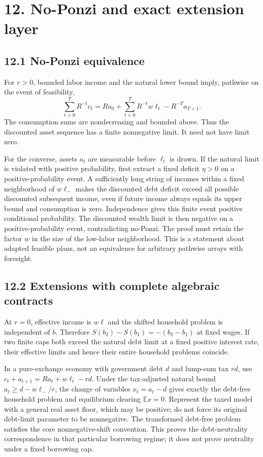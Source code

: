 \documentclass[
  11pt,
]{article}
\begin{document}
\section{12. No-Ponzi and exact extension
layer}\label{no-ponzi-and-exact-extension-layer}

\subsection{12.1 No-Ponzi equivalence}\label{no-ponzi-equivalence}

For \(r>0\), bounded labor income and the natural lower bound imply,
pathwise on the event of feasibility, \[
\sum_{t=0}^{T}R^{-t}c_t
=Ra_0+\sum_{t=0}^{T}R^{-t}w\ell_t-R^{-T}a_{T+1}.
\] The consumption sums are nondecreasing and bounded above. Thus the
discounted asset sequence has a finite nonnegative limit. It need not
have limit zero.

For the converse, assets \(a_t\) are measurable before \(\ell_t\) is
drawn. If the natural limit is violated with positive probability, first
extract a fixed deficit \(\eta>0\) on a positive-probability event. A
sufficiently long string of incomes within a fixed neighborhood of
\(w\ell_-\) makes the discounted debt deficit exceed all possible
discounted subsequent income, even if future income always equals its
upper bound and consumption is zero. Independence gives this finite
event positive conditional probability. The discounted wealth limit is
then negative on a positive-probability event, contradicting no-Ponzi.
The proof must retain the factor \(w\) in the size of the low-labor
neighborhood. This is a statement about adapted feasible plans, not an
equivalence for arbitrary pathwise arrays with foresight.

\subsection{12.2 Extensions with complete algebraic
contracts}\label{extensions-with-complete-algebraic-contracts}

At \(r=0\), effective income is \(w\ell\) and the shifted household
problem is independent of \(b\). Therefore \(S(b_2)-S(b_1)=-(b_2-b_1)\)
at fixed wages. If two finite caps both exceed the natural debt limit at
a fixed positive interest rate, their effective limits and hence their
entire household problems coincide.

In a pure-exchange economy with government debt \(d\) and lump-sum tax
\(rd\), use \(c_t+a_{t+1}=Ra_t+w\ell_t-rd\). Under the tax-adjusted
natural bound \(a_t\geq d-w\ell_-/r\), the change of variables
\(x_t=a_t-d\) gives exactly the debt-free household problem and
equilibrium clearing \(\mathbb Ex=0\). Represent the taxed model with a
general real asset floor, which may be positive; do not force its
original debt-limit parameter to be nonnegative. The transformed
debt-free problem satisfies the core nonnegative-shift convention. This
proves the debt-neutrality correspondence in that particular borrowing
regime; it does not prove neutrality under a fixed borrowing cap.
\end{document}
